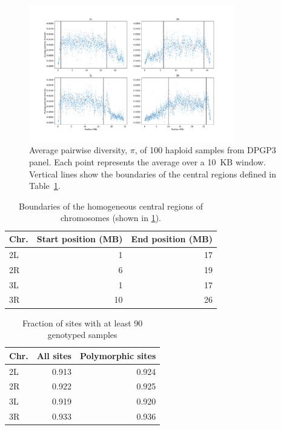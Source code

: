 \documentclass[11pt, letterpaper]{article}   	%
\begin{document}
\begin{figure}[h!]
\centering
\includegraphics[width=0.8\textwidth]{figures/pi_vs_position.pdf}
\caption{Average pairwise diversity, $\pi$, of 100 haploid samples from DPGP3 panel. Each point represents the average over a 10~KB window. Vertical lines show the boundaries of the central regions defined in Table~\ref{tab:central_regions}.
\label{fig:dpgp_pi}}
\end{figure}

\begin{table}[h!]
  \begin{center}
    \caption{Boundaries of the homogeneous central regions of chromosomes (shown in \ref{fig:dpgp_pi}).}
    \label{tab:central_regions}
    \begin{tabular}{l|r|r} %
      \textbf{Chr.} & \textbf{Start position (MB)} & \textbf{End position (MB)}\\
      \hline
      2L & 1 & 17\\
      2R & 6 & 19\\
      3L & 1 & 17\\
      3R & 10 & 26
    \end{tabular}
  \end{center}
\end{table}

\begin{table}[h!]
  \begin{center}
    \caption{Fraction of sites with at least 90 genotyped samples}
    \label{tab:called_sites}
    \begin{tabular}{l|r|r} %
      \textbf{Chr.} & \textbf{All sites} & \textbf{Polymorphic sites}\\
      \hline
      2L & 0.913 & 0.924 \\
      2R & 0.922 & 0.925 \\
      3L & 0.919 & 0.920 \\
      3R & 0.933 & 0.936
    \end{tabular}
  \end{center}
\end{table}
\end{document}
